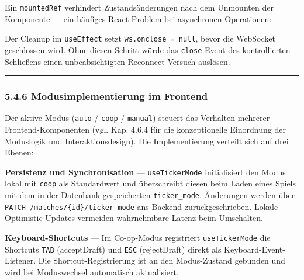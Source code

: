 Ein \texttt{mountedRef} verhindert Zustandsänderungen nach dem Unmounten
der Komponente --- ein häufiges React-Problem bei asynchronen
Operationen:

\begin{Shaded}
\begin{Highlighting}[]
 \OperatorTok{=}\NormalTok{ () }\KeywordTok{=\textgreater{}}\NormalTok{ \{}
  \NormalTok{ (}\OperatorTok{!}\NormalTok{) }\OperatorTok{;} 
\NormalTok{\}}\OperatorTok{;}
\end{Highlighting}
\end{Shaded}

Der Cleanup im \texttt{useEffect} setzt \texttt{ws.onclose\ =\ null},
bevor die WebSocket geschlossen wird. Ohne diesen Schritt würde das
\texttt{close}-Event des kontrollierten Schließens einen
unbeabsichtigten Reconnect-Versuch auslösen.

\begin{center}\rule{0.5\linewidth}{0.5pt}\end{center}

\subsubsection{5.4.6 Modusimplementierung im
Frontend}\label{modusimplementierung-im-frontend}

Der aktive Modus (\texttt{auto} / \texttt{coop} / \texttt{manual})
steuert das Verhalten mehrerer Frontend-Komponenten (vgl. Kap. 4.6.4 für
die konzeptionelle Einordnung der Moduslogik und Interaktionsdesign).
Die Implementierung verteilt sich auf drei Ebenen:

\textbf{Persistenz und Synchronisation} --- \texttt{useTickerMode}
initialisiert den Modus lokal mit \texttt{coop} als Standardwert und
überschreibt diesen beim Laden eines Spiels mit dem in der Datenbank
gespeicherten \texttt{ticker\_mode}. Änderungen werden über
\texttt{PATCH\ /matches/\{id\}/ticker-mode} ans Backend
zurückgeschrieben. Lokale Optimistic-Updates vermeiden wahrnehmbare
Latenz beim Umschalten.

\textbf{Keyboard-Shortcuts} --- Im Co-op-Modus registriert
\texttt{useTickerMode} die Shortcuts \texttt{TAB} (acceptDraft) und
\texttt{ESC} (rejectDraft) direkt als Keyboard-Event-Listener. Die
Shortcut-Registrierung ist an den Modus-Zustand gebunden und wird bei
Moduswechsel automatisch aktualisiert.

